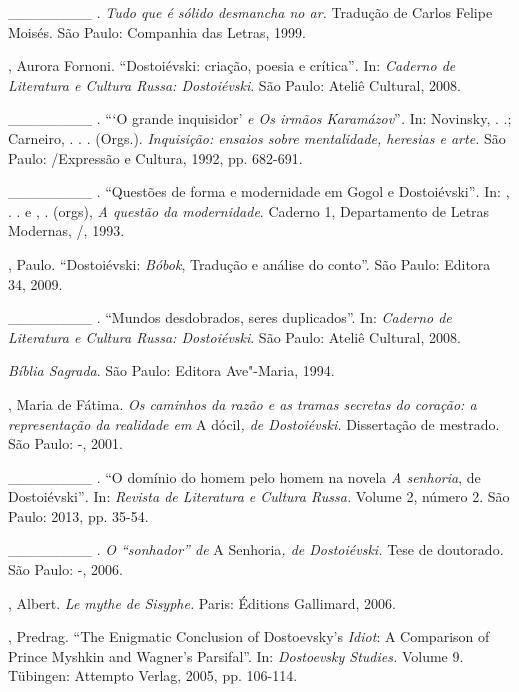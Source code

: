 \begin{Parskip}
\_\_\_\_\_\_\_\_ . \emph{Tudo que é sólido desmancha no ar.} Tradução de
Carlos Felipe Moisés. São Paulo: Companhia das Letras, 1999.

, Aurora Fornoni. ``Dostoiévski: criação, poesia e
crítica''\emph{.} In: \emph{Caderno de Literatura e Cultura Russa:
Dostoiévski}. São Paulo: Ateliê Cultural, 2008.

\_\_\_\_\_\_\_\_ . ```O grande inquisidor' \emph{e Os irmãos
Karamázov}''\emph{.} In: Novinsky, . .; Carneiro, . . . (Orgs.).
\emph{Inquisição: ensaios sobre mentalidade, heresias e arte.} São
Paulo: /Expressão e Cultura, 1992, pp. 682-691.

\_\_\_\_\_\_\_\_ . ``Questões de forma e modernidade em Gogol e
Dostoiévski''\emph{.} In: , . . e , . (orgs), \emph{A
questão da modernidade}. Caderno 1, Departamento de Letras Modernas,
/, 1993.

, Paulo. ``Dostoiévski: \emph{Bóbok}, Tradução e análise do
conto''. São Paulo: Editora 34, 2009.

\_\_\_\_\_\_\_\_ . ``Mundos desdobrados, seres duplicados''. In:
\emph{Caderno de Literatura e Cultura Russa: Dostoiévski}. São Paulo:
Ateliê Cultural, 2008.

\emph{Bíblia Sagrada}. São Paulo: Editora Ave"-Maria, 1994.

, Maria de Fátima. \emph{Os caminhos da razão e as tramas
secretas do coração: a representação da realidade em} A dócil\emph{, de
Dostoiévski.} Dissertação de mestrado. São Paulo: -, 2001.

\_\_\_\_\_\_\_\_ . ``O domínio do homem pelo homem na novela \emph{A
senhoria}, de Dostoiévski''\emph{.} In: \emph{Revista de Literatura e
Cultura Russa.} Volume 2, número 2. São Paulo: 2013, pp. 35-54.

\_\_\_\_\_\_\_\_ . \emph{O ``sonhador'' de} A Senhoria\emph{, de
Dostoiévski.} Tese de doutorado. São Paulo: -, 2006.

, Albert. \emph{Le mythe de Sisyphe.} Paris: Éditions Gallimard,
2006.

, Predrag. ``The Enigmatic Conclusion of Dostoevsky's
\emph{Idiot}: A Comparison of Prince Myshkin and Wagner's Parsifal''.
In: \emph{Dostoevsky Studies.} Volume 9. Tübingen: Attempto Verlag,
2005, pp. 106-114.


\end{Parskip}
